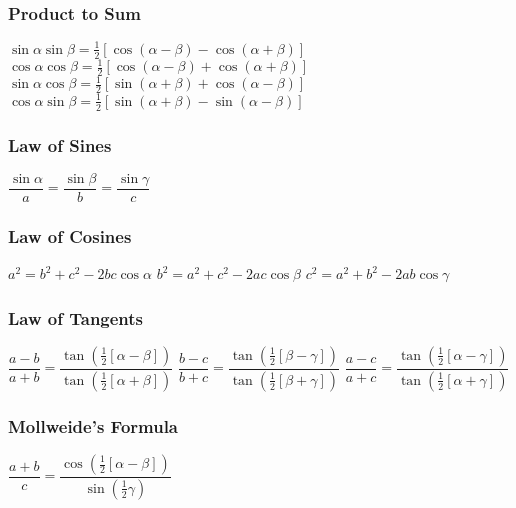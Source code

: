 \subsubsection{Product to Sum}
\begin{itemize}
\itemt \( \sin \alpha \sin \beta = \frac{1}{2} [\cos(\alpha-\beta)-\cos(\alpha+\beta)] \)
\itemt \( \cos \alpha \cos \beta = \frac{1}{2} [\cos(\alpha-\beta)+\cos(\alpha+\beta)] \)
\itemt \( \sin \alpha \cos \beta = \frac{1}{2} [\sin(\alpha+\beta)+\cos(\alpha-\beta)] \)
\itemt \( \cos \alpha \sin \beta = \frac{1}{2} [\sin(\alpha+\beta)-\sin(\alpha-\beta)] \)
\end{itemize}

\subsubsection{Law of Sines}
\begin{itemize}
\itemt \( \dfrac{\sin\alpha}{a} = \dfrac{\sin\beta}{b} = \dfrac{\sin\gamma}{c} \)
\end{itemize}

\subsubsection{Law of Cosines}
\begin{itemize}
\itemt \( a^2 = b^2 + c^2 - 2bc\cos\alpha \)
\itemt \( b^2 = a^2 + c^2 - 2ac\cos\beta \)
\itemt \( c^2 = a^2 + b^2 - 2ab\cos\gamma \)
\end{itemize}

\subsubsection{Law of Tangents}
\begin{itemize}
\itemt \( \dfrac{a-b}{a+b} = \dfrac{\tan(\frac{1}{2}[\alpha-\beta])}{\tan(\frac{1}{2}[\alpha+\beta])} \)
\itemt \( \dfrac{b-c}{b+c} = \dfrac{\tan(\frac{1}{2}[\beta-\gamma])}{\tan(\frac{1}{2}[\beta+\gamma])} \)
\itemt \( \dfrac{a-c}{a+c} = \dfrac{\tan(\frac{1}{2}[\alpha-\gamma])}{\tan(\frac{1}{2}[\alpha+\gamma])} \)
\end{itemize}

\subsubsection{Mollweide's Formula}
\begin{itemize}
\itemt \( \dfrac{a+b}{c} = \dfrac{\cos(\frac{1}{2}[\alpha-\beta])}{\sin(\frac{1}{2}\gamma)} \)
\end{itemize}

